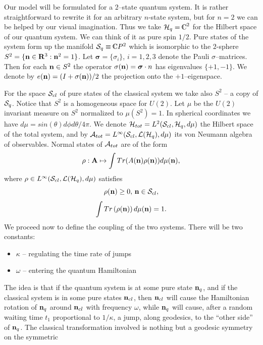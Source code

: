 \documentclass[12pt]{article}
\def\complex{{\kern .1em {\raise .47ex \hbox
{$\scriptscriptstyle
|$}}
\kern -.4em {\rm C}}}
\begin{document}
Our model will be formulated for a $2$--state quantum system.  It is
rather straightforward to rewrite it for an arbitrary $n$-state system, 
but for $n=2$ we can be helped by our visual imagination.  Thus we take
${\cal H}_q=\complex^2$ for the Hilbert space of our quantum system.  We
can think of it as pure spin $1/2$.  Pure states of the system form up
the manifold ${\cal S}_q\equiv\complex P^2$ which is isomorphic to the
$2$-sphere $S^2=\{ {\bf n}\in {\bf R}^3: {\bf n}^2=1\}$. 
Let ${\boldsymbol \sigma}=\{\sigma_i\}$, 
$i=1, 2, 3$ denote the Pauli $\sigma$--matrices.  Then for each ${\bf n}\in S^2$
the operator $\sigma ({\bf n})={\boldsymbol\sigma\cdot n}$ has eigenvalues
$\{+1, -1\} $.  We denote by $e ({\bf n})= (I+\sigma ({\bf n}))/2$ the projection
onto the $+1$--eigenspace.

For the space ${\cal S}_{cl}$ of pure states of the classical system we
take also $S^2$ -- a copy of ${\cal S}_q$.  Notice that
$S^2$ is a homogeneous space for $U (2)$.  Let $\mu$ be the $U (2)$
invariant measure on $S^2$ normalized to $\mu  (S^2)=1$.  In spherical
coordinates we have $d\mu=sin (\theta)d\phi d\theta /4\pi$. 
We denote ${\cal H}_{tot}=L^2 ({\cal S}_{cl}, {\cal H}_q, d\mu )$ the 
Hilbert space of the total system,  and by 
${\cal A}_{tot}=L^{\infty} ({\cal S}_{cl}, 
{\cal L} ({\cal H}_q), d\mu )$ its von Neumann algebra of observables. 
 Normal states of ${\cal A}_{tot}$ are 
of the form $$\rho: {\bf A}\mapsto\int Tr (A ({\bf n})\rho ({\bf n}))d\mu ({\bf n}), $$
where
$\rho\in L^{\infty} ({\cal S}_{cl},  {\cal L} ({\cal H}_q), d\mu )$  satisfies
$$\rho  ({\bf n})\geq 0 , \,  {\bf n}\in {\cal S}_{cl} , $$
$$\int Tr \left (\rho  ({\bf n})\right) d\mu  ({\bf n}) =1 . $$
We proceed now to define the coupling of the two systems.  There will be two
constants:  
\begin{itemize}
\item $\kappa$ -- regulating the time rate of jumps 
\item $\omega$ -- entering the quantum Hamiltonian 
\end{itemize}
 The idea is that if the quantum system is at some pure state
${\bf n}_q$,  and if the classical system is in some pure states ${\bf n}_{cl}$, 
then
${\bf n}_{cl}$ will cause 
the Hamiltonian rotation of ${\bf n}_{q}$  around
${\bf n}_{cl}$ with frequency $\omega$,  while ${\bf n}_q$ will cause,  
after a random waiting time $t_1$ proportional to $1/\kappa$,  
a jump,  along geodesics,  to the ``other side'' of ${\bf n}_q$. 
The classical transformation involved 
is nothing but a geodesic symmetry on the symmetric
\end{document}
